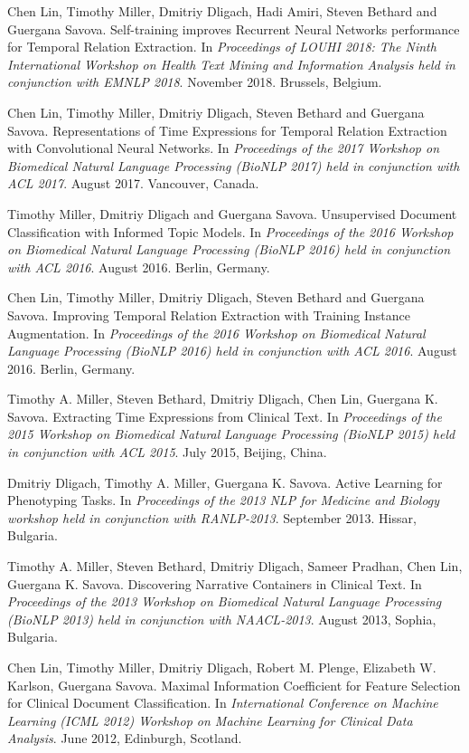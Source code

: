 \documentclass[letterpaper]{article}
\renewenvironment{itemize}{
  \begin{list}{}{
    \setlength{\leftmargin}{1.5em}
  }
}{
  \end{list}
}
\begin{document}
\begin{itemize}
\item Chen Lin, Timothy Miller, Dmitriy Dligach, Hadi Amiri, Steven Bethard and Guergana Savova. Self-training improves Recurrent Neural Networks performance for Temporal Relation Extraction. In \emph{Proceedings of LOUHI 2018: The Ninth International Workshop on Health Text Mining and Information Analysis held in conjunction with EMNLP 2018}. November 2018. Brussels, Belgium.
\item Chen Lin, Timothy Miller, Dmitriy Dligach, Steven Bethard and Guergana Savova. Representations of Time Expressions for Temporal Relation Extraction with Convolutional Neural Networks. In \emph{Proceedings of the 2017 Workshop on Biomedical Natural Language Processing (BioNLP 2017) held in conjunction with ACL 2017}. August 2017. Vancouver, Canada.
\item Timothy Miller, Dmitriy Dligach and Guergana Savova. Unsupervised Document Classification with Informed Topic Models. In \emph{Proceedings of the 2016 Workshop on Biomedical Natural Language Processing (BioNLP 2016) held in conjunction with ACL 2016}. August 2016. Berlin, Germany.
\item Chen Lin, Timothy Miller, Dmitriy Dligach, Steven Bethard and Guergana Savova. Improving Temporal Relation Extraction with Training Instance Augmentation. In \emph{Proceedings of the 2016 Workshop on Biomedical Natural Language Processing (BioNLP 2016) held in conjunction with ACL 2016}. August 2016. Berlin, Germany.
\item Timothy A. Miller, Steven Bethard, Dmitriy Dligach, Chen Lin, Guergana K. Savova. Extracting Time Expressions from Clinical Text. In \emph{Proceedings of the 2015 Workshop on Biomedical Natural Language Processing (BioNLP 2015) held in conjunction with ACL 2015}. July 2015, Beijing, China.
\item Dmitriy Dligach, Timothy A. Miller, Guergana K. Savova. Active Learning for Phenotyping Tasks. In \emph{Proceedings of the 2013 NLP for Medicine and Biology workshop held in conjunction with RANLP-2013}. September 2013. Hissar, Bulgaria.
\item Timothy A. Miller, Steven Bethard, Dmitriy Dligach, Sameer Pradhan, Chen Lin, Guergana K. Savova. Discovering Narrative Containers in Clinical Text. In \emph{Proceedings of the 2013 Workshop on Biomedical Natural Language Processing (BioNLP 2013) held in conjunction with NAACL-2013}. August 2013, Sophia, Bulgaria.
\item Chen Lin, Timothy Miller, Dmitriy Dligach, Robert M. Plenge, Elizabeth W. Karlson, Guergana Savova. Maximal Information Coefficient for Feature Selection for Clinical Document Classification. In \emph{International Conference on Machine Learning (ICML 2012) Workshop on Machine Learning for Clinical Data Analysis}. June 2012, Edinburgh, Scotland.

\end{itemize}
\end{document}
